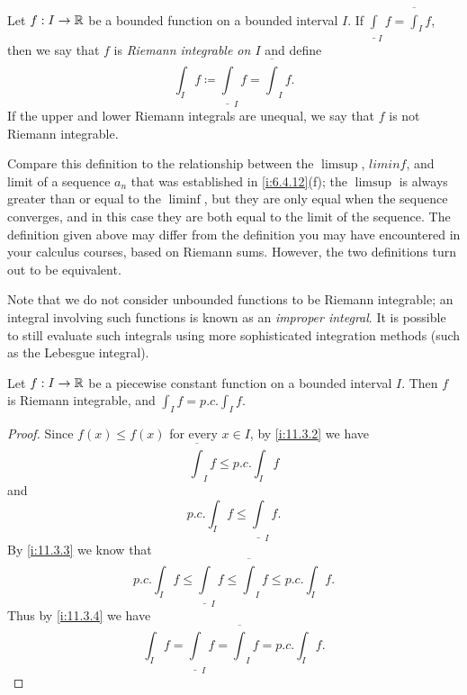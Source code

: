 \begin{defn}\label{i:11.3.4}
  Let \(f : I \to \mathbb{R}\) be a bounded function on a bounded interval \(I\).
  If \(\underline{\int}_I f = \overline{\int}_I f\), then we say that \(f\) is \emph{Riemann integrable on \(I\)} and define
  \[
    \int_I f \coloneqq \underline{\int}_I f = \overline{\int}_I f.
  \]
  If the upper and lower Riemann integrals are unequal, we say that \(f\) is not Riemann integrable.
\end{defn}

\begin{rmk}\label{i:11.3.5}
  Compare this definition to the relationship between the \(\limsup\), \(liminf\), and limit of a sequence \(a_n\) that was established in \cref{i:6.4.12}(f);
  the \(\limsup\) is always greater than or equal to the \(\liminf\), but they are only equal when the sequence converges, and in this case they are both equal to the limit of the sequence.
  The definition given above may differ from the definition you may have encountered in your calculus courses, based on Riemann sums.
  However, the two definitions turn out to be equivalent.
\end{rmk}

\begin{rmk}\label{i:11.3.6}
  Note that we do not consider unbounded functions to be Riemann integrable;
  an integral involving such functions is known as an \emph{improper integral}.
  It is possible to still evaluate such integrals using more sophisticated integration methods (such as the Lebesgue integral).
\end{rmk}

\begin{lem}\label{i:11.3.7}
  Let \(f : I \to \mathbb{R}\) be a piecewise constant function on a bounded interval \(I\).
  Then \(f\) is Riemann integrable, and \(\int_I f = p.c. \int_I f\).
\end{lem}

\begin{proof}
  Since \(f(x) \leq f(x)\) for every \(x \in I\), by \cref{i:11.3.2} we have
  \[
    \overline{\int}_I f \leq p.c. \int_I f
  \]
  and
  \[
    p.c. \int_I f \leq \underline{\int}_I f.
  \]
  By \cref{i:11.3.3} we know that
  \[
    p.c. \int_I f \leq \underline{\int}_I f \leq \overline{\int}_I f \leq p.c. \int_I f.
  \]
  Thus by \cref{i:11.3.4} we have
  \[
    \int_I f = \underline{\int}_I f = \overline{\int}_I f = p.c. \int_I f.
  \]
\end{proof}


